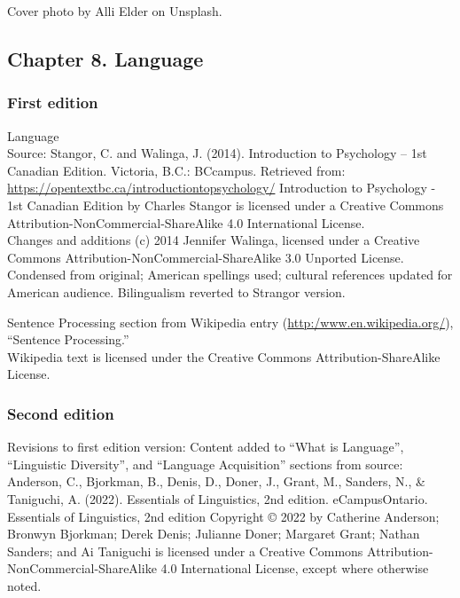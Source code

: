 \documentclass[
]{krantz}
\begin{document}
Cover photo by Alli Elder on Unsplash.

\subsection*{Chapter 8. Language}\label{chapter-8.-language}


\subsubsection*{First edition}\label{first-edition-8}


Language\\
Source: Stangor, C. and Walinga, J. (2014). Introduction to Psychology -- 1st Canadian Edition. Victoria, B.C.: BCcampus. Retrieved from: \url{https://opentextbc.ca/introductiontopsychology/}
Introduction to Psychology - 1st Canadian Edition by Charles Stangor is licensed under a Creative Commons Attribution-NonCommercial-ShareAlike 4.0 International License.\\
Changes and additions (c) 2014 Jennifer Walinga, licensed under a Creative Commons Attribution-NonCommercial-ShareAlike 3.0 Unported License.\\
Condensed from original; American spellings used; cultural references updated for American audience. Bilingualism reverted to Strangor version.

Sentence Processing section from Wikipedia entry (\url{http:/www.en.wikipedia.org/}), ``Sentence Processing.''\\
Wikipedia text is licensed under the Creative Commons Attribution-ShareAlike License.

\subsubsection*{Second edition}\label{second-edition-7}


Revisions to first edition version: Content added to ``What is Language'', ``Linguistic Diversity'', and ``Language Acquisition'' sections from source: Anderson, C., Bjorkman, B., Denis, D., Doner, J., Grant, M., Sanders, N., \& Taniguchi, A. (2022). Essentials of Linguistics, 2nd edition. eCampusOntario.
Essentials of Linguistics, 2nd edition Copyright © 2022 by Catherine Anderson; Bronwyn Bjorkman; Derek Denis; Julianne Doner; Margaret Grant; Nathan Sanders; and Ai Taniguchi is licensed under a Creative Commons Attribution-NonCommercial-ShareAlike 4.0 International License, except where otherwise noted.\\
\end{document}
